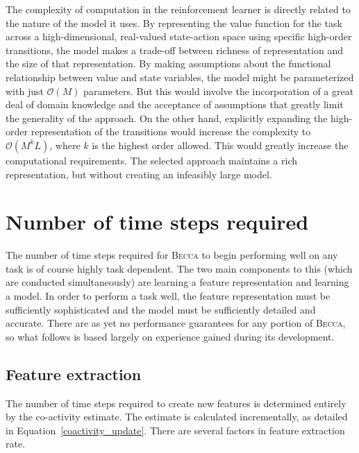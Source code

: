 The complexity of computation in the reinforcement learner is directly related to the nature of the model it uses. By representing the value function for the task across a high-dimensional, real-valued state-action space using specific high-order transitions, the model makes a trade-off between richness of representation and the size of that representation. By making assumptions about the functional relationship between value and state variables, the model might be parameterized with just  $\mathcal{O}(M)$ parameters. But this would involve the incorporation of a great deal of domain knowledge and the acceptance of assumptions that greatly limit the generality of the approach. On the other hand, explicitly expanding the high-order representation of the transitions would increase the complexity to $\mathcal{O}(M^kL)$, where $k$ is the highest order allowed. This would greatly increase the computational requirements. The selected approach maintains a rich representation, but without creating an infeasibly large model.

\section{Number of time steps required}  

The number of time steps required for \textsc{Becca} to begin performing well on any task is of course highly task dependent. The two main components to this (which are conducted simultaneously) are learning a feature representation and learning a model. In order to perform a task well, the feature representation must be sufficiently sophisticated  and the model must be sufficiently detailed and accurate. There are as yet no performance guarantees for any portion of  \textsc{Becca}, so what follows is based largely on experience gained during its development.

\subsection{Feature extraction}
The number of time steps required to create new features is determined entirely by the co-activity estimate. The estimate is calculated incrementally, as detailed in Equation~\ref{coactivity_update}. There are several factors in feature extraction rate.

